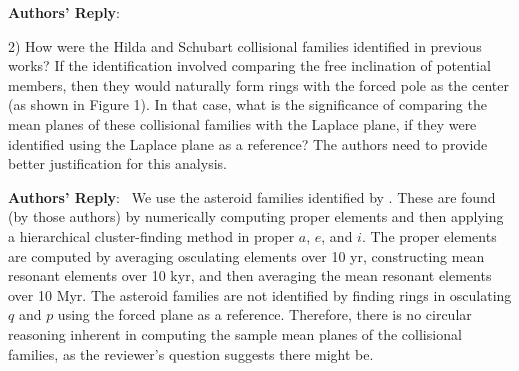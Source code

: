 \documentclass[11pt]{article}
\newcounter{reviewer}
\newenvironment{reply}
   {\medskip \noindent \begin{sf}\textbf{Authors' Reply}:\  }
   {\medskip \end{sf}\medskip}
\newcommand{\edit}[1]{{\color{red}#1}}
\begin{document}
\begin{reply}


\end{reply}

2) How were the Hilda and Schubart collisional families identified in previous works? If the identification involved comparing the free inclination of potential members, then they would naturally form rings with the forced pole as the center (as shown in Figure 1). In that case, what is the significance of comparing the mean planes of these collisional families with the Laplace plane, if they were identified using the Laplace plane as a reference? The authors need to provide better justification for this analysis.

\begin{reply}
We use the asteroid families identified by \citet{vokrouhlicky2025orbital}.
These are found (by those authors) by numerically computing proper elements and then applying a hierarchical cluster-finding method in proper $a$, $e$, and $i$.
The proper elements are computed by averaging osculating elements over 10 yr, constructing mean resonant elements over 10 kyr, and then averaging the mean resonant elements over 10 Myr.
The asteroid families are not identified by finding rings in osculating $q$ and $p$ using the forced plane as a reference.
Therefore, there is no circular reasoning inherent in computing the sample mean planes of the collisional families, as the reviewer's question suggests there might be.
\end{reply}
\end{document}
